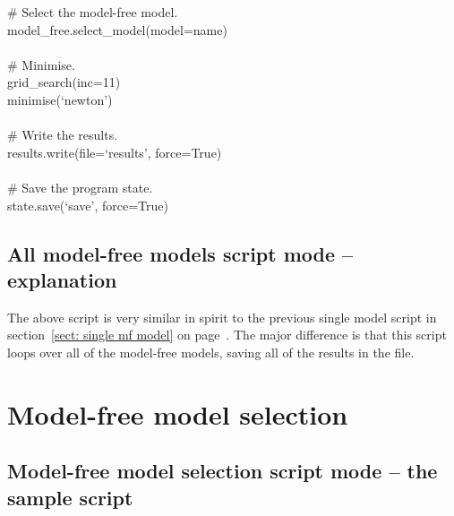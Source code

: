 \begin{htmlonly}
\begin{htmlonly}
\begin{exampleenv}
\hspace*{4ex} \# Select the model-free model. \\
\hspace*{4ex} model\_free.select\_model(model=name) \\
 \\
\hspace*{4ex} \# Minimise. \\
\hspace*{4ex} grid\_search(inc=11) \\
\hspace*{4ex} minimise(`newton') \\
 \\
\hspace*{4ex} \# Write the results. \\
\hspace*{4ex} results.write(file=`results', force=True) \\
 \\
\# Save the program state. \\
state.save(`save', force=True)
\end{exampleenv}



\subsection{All model-free models script mode -- explanation}

The above script is very similar in spirit to the previous single model script in section~\ref{sect: single mf model} on page~\pageref{sect: single mf model}.  The major difference is that this script loops over all of the model-free models, saving all of the results in the  file.




\section{Model-free model selection}



\subsection{Model-free model selection script mode -- the sample script}


\end{htmlonly}
\end{htmlonly}
